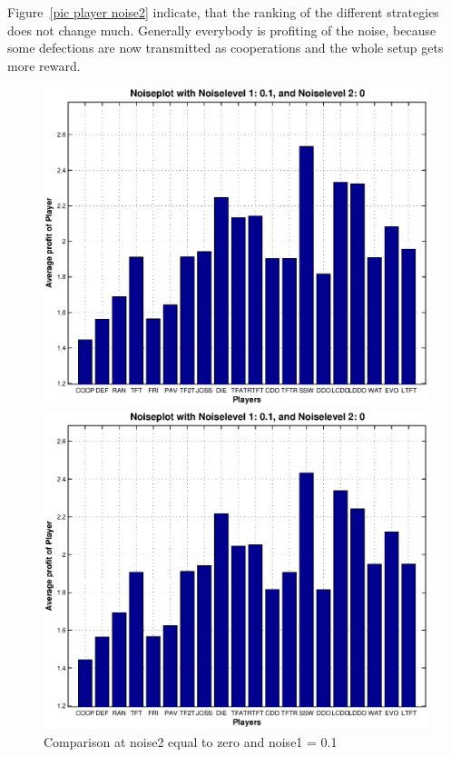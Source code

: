 Figure~\ref{pic player noise2} indicate, that the ranking of the different strategies does not change much. Generally everybody is profiting of the noise, because some defections are now transmitted as cooperations and the whole setup gets more reward.\\

\begin{figure}[h]
\caption{Comparison at noise2 equal to zero and noise1 = 0.1}
	\label{pic player noise3}
\begin{minipage}[hbt]{0.68\textwidth}
	\centering
	\includegraphics[width=\textwidth]{pics/simulation1/Reward_of_all_Players_at_given_Noiselevels_3}
\end{minipage}
\hfill
\begin{minipage}[hbt]{0.3\textwidth}
	\centering
	\includegraphics[width=\textwidth]{pics/simulation2/Reward_of_all_Players_at_given_Noiselevels_3}
\end{minipage}	
\end{figure}


